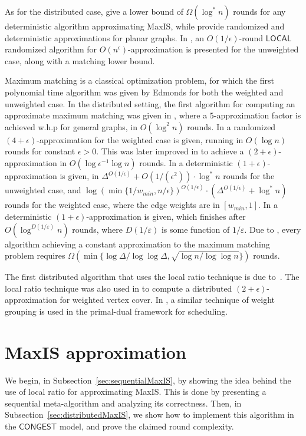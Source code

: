\documentclass[11pt]{article}
\newcommand{\eps}{\varepsilon}
\begin{document}
As for the distributed case, \cite{lenzen2008leveraging, czygrinow2008fast} give a lower bound of $\Omega(\log^* n)$ rounds for any deterministic algorithm approximating MaxIS, while \cite{czygrinow2008fast} provide randomized and deterministic approximations for planar graphs. In \cite{bodlaenderbrief}, an $O(1/\epsilon)$-round $\mathsf{LOCAL}$ randomized algorithm for $O(n^{\epsilon})$-approximation is presented for the unweighted case, along with a matching lower bound.

Maximum matching is a classical optimization problem, for which the first polynomial time algorithm was given by Edmonds \cite{edmonds1965maximum, edmonds1965paths} for both the weighted and unweighted case. In the distributed setting, the first algorithm for computing an approximate maximum matching was given in \cite{wattenhofer2004distributed}, where a $5$-approximation factor is achieved w.h.p for general graphs, in $O(\log^2 n)$ rounds.
In \cite{lotker2009distributed} a randomized $(4+\epsilon)$-approximation for the weighted case is given, running in $O(\log n)$ rounds for constant $\epsilon>0$. This was later improved in \cite{lotker2008improved} to achieve a $(2+\epsilon)$-approximation in $O(\log \epsilon^{-1} \log n)$ rounds. In \cite{even2015distributed} a deterministic $(1+\epsilon)$-approximation is given, in $\Delta^{O(1/\epsilon)} + O(1/(\epsilon^2)) \cdot \log^* n$ rounds for the unweighted case, and $\log(\min \{ 1/ w_{min} , n / \epsilon \})^{O(1 / \epsilon)} \cdot (\Delta^{O(1/\epsilon)} + \log^* n)$ rounds for the weighted case, where the edge weights are in $[w_{min}, 1]$. In \cite{CzygrinowH03} a deterministic $(1+\epsilon)$-approximation is given, which finishes after $O(\log^{D(1/\eps)} n)$ rounds, where $D(1/\eps)$ is some function of $1/\eps$.
Due to \cite{kuhn2006price}, every algorithm achieving a constant approximation to the maximum matching problem requires $\Omega(\min\{\log \Delta/ \log\log \Delta, \sqrt{\log n / \log \log n}\})$ rounds.

The first distributed algorithm that uses the local ratio technique is due to~\cite{patt2008distributed}. The local ratio technique was also used in \cite{bar2016distributed} to compute a distributed $(2+\epsilon)$-approximation for weighted vertex cover. In \cite{panconesi2008fast}, a similar technique of weight grouping is used in the primal-dual framework for scheduling.

\section{MaxIS approximation}
\label{sec:MaxIS}
We begin, in Subsection~\ref{sec:sequentialMaxIS}, by showing the idea behind the use of local ratio for approximating MaxIS. This is done by presenting a sequential meta-algorithm and analyzing its correctness. Then, in Subsection~\ref{sec:distributedMaxIS}, we show how to implement this algorithm in the $\mathsf{CONGEST}$ model, and prove the claimed round complexity.
\end{document}
